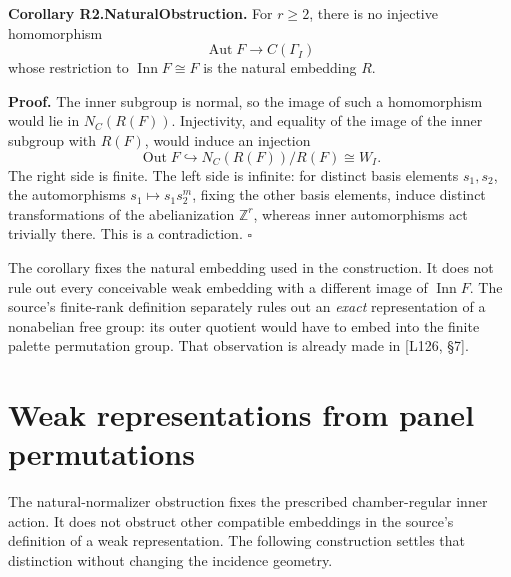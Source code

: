 \textbf{Corollary R2.NaturalObstruction.} For \(r\ge2\), there is no
injective homomorphism \[
\operatorname{Aut}F\longrightarrow C(\Gamma_I)
\] whose restriction to \(\operatorname{Inn}F\cong F\) is the natural
embedding \(R\).

\textbf{Proof.} The inner subgroup is normal, so the image of such a
homomorphism would lie in \(N_C(R(F))\). Injectivity, and equality of
the image of the inner subgroup with \(R(F)\), would induce an injection
\[
\operatorname{Out}F\hookrightarrow N_C(R(F))/R(F)\cong W_I.
\] The right side is finite. The left side is infinite: for distinct
basis elements \(s_1,s_2\), the automorphisms \(s_1\mapsto s_1s_2^m\),
fixing the other basis elements, induce distinct transformations of the
abelianization \(\mathbb Z^r\), whereas inner automorphisms act
trivially there. This is a contradiction. \(\square\)

The corollary fixes the natural embedding used in the construction. It
does not rule out every conceivable weak embedding with a different
image of \(\operatorname{Inn}F\). The source's finite-rank definition
separately rules out an \emph{exact} representation of a nonabelian free
group: its outer quotient would have to embed into the finite palette
permutation group. That observation is already made in {[}L126, §7{]}.

\section{Weak representations from panel permutations}
The natural-normalizer obstruction fixes the prescribed chamber-regular
inner action. It does not obstruct other compatible embeddings in the
source's definition of a weak representation. The following construction
settles that distinction without changing the incidence geometry.

